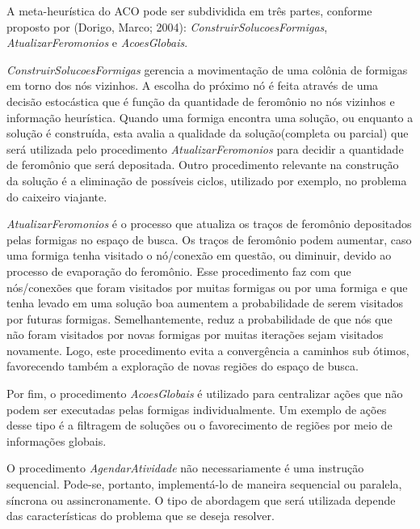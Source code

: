 A meta-heurística do ACO pode ser subdividida em três partes,
conforme proposto por (Dorigo, Marco; 2004): \textit{ConstruirSolucoesFormigas},
\textit{AtualizarFeromonios} e \textit{AcoesGlobais}.

\textit{ConstruirSolucoesFormigas} gerencia a movimentação de uma colônia de formigas
em torno dos nós vizinhos. A escolha do próximo nó é feita através de uma decisão
estocástica que é função da quantidade de feromônio no nós vizinhos e informação heurística.
Quando uma formiga encontra uma solução, ou enquanto a solução é construída, esta avalia a
qualidade da solução(completa ou parcial) que será utilizada pelo procedimento
\textit{AtualizarFeromonios} para decidir a quantidade de feromônio que será depositada.
Outro procedimento relevante na construção da solução é a eliminação de possíveis ciclos, utilizado
por exemplo, no problema do caixeiro viajante.

\textit{AtualizarFeromonios} é o processo que atualiza os traços de feromônio depositados pelas
formigas no espaço de busca. Os traços de feromônio podem aumentar, caso uma formiga tenha visitado
o nó/conexão em questão, ou diminuir, devido ao processo de evaporação do feromônio. Esse procedimento faz com 
que nós/conexões que foram visitados por muitas formigas ou por uma formiga e que tenha levado em
uma solução boa aumentem a probabilidade de serem visitados por futuras formigas. Semelhantemente, reduz 
a probabilidade de que nós que não foram visitados por novas formigas por muitas iterações sejam visitados
novamente. Logo, este procedimento evita a convergência a caminhos sub ótimos, favorecendo também a exploração
de novas regiões do espaço de busca.

Por fim, o procedimento \textit{AcoesGlobais} é utilizado para centralizar ações que não podem ser executadas
pelas formigas individualmente. Um exemplo de ações desse tipo é a filtragem de soluções ou o favorecimento de
regiões por meio de informações globais.

O procedimento \textit{AgendarAtividade} não necessariamente é uma instrução sequencial. Pode-se, portanto,
implementá-lo de maneira sequencial ou paralela, síncrona ou assincronamente. O tipo de abordagem que será
utilizada depende das características do problema que se deseja resolver.
